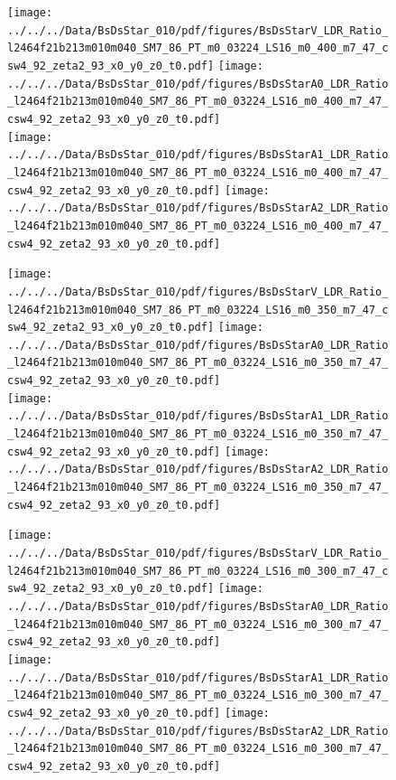 \documentclass[a4paper,10pt]{article}
\begin{document}
\begin{figure}[p]
 \texttt{[image: ../../../Data/BsDsStar\_010/pdf/figures/BsDsStarV\_LDR\_Ratio\_l2464f21b213m010m040\_SM7\_86\_PT\_m0\_03224\_LS16\_m0\_400\_m7\_47\_csw4\_92\_zeta2\_93\_x0\_y0\_z0\_t0.pdf]}  
\texttt{[image: ../../../Data/BsDsStar\_010/pdf/figures/BsDsStarA0\_LDR\_Ratio\_l2464f21b213m010m040\_SM7\_86\_PT\_m0\_03224\_LS16\_m0\_400\_m7\_47\_csw4\_92\_zeta2\_93\_x0\_y0\_z0\_t0.pdf]} \\ 
\texttt{[image: ../../../Data/BsDsStar\_010/pdf/figures/BsDsStarA1\_LDR\_Ratio\_l2464f21b213m010m040\_SM7\_86\_PT\_m0\_03224\_LS16\_m0\_400\_m7\_47\_csw4\_92\_zeta2\_93\_x0\_y0\_z0\_t0.pdf]}  
\texttt{[image: ../../../Data/BsDsStar\_010/pdf/figures/BsDsStarA2\_LDR\_Ratio\_l2464f21b213m010m040\_SM7\_86\_PT\_m0\_03224\_LS16\_m0\_400\_m7\_47\_csw4\_92\_zeta2\_93\_x0\_y0\_z0\_t0.pdf]} \\ 
\end{figure} 
\clearpage

\begin{figure}[p]
 \texttt{[image: ../../../Data/BsDsStar\_010/pdf/figures/BsDsStarV\_LDR\_Ratio\_l2464f21b213m010m040\_SM7\_86\_PT\_m0\_03224\_LS16\_m0\_350\_m7\_47\_csw4\_92\_zeta2\_93\_x0\_y0\_z0\_t0.pdf]}  
\texttt{[image: ../../../Data/BsDsStar\_010/pdf/figures/BsDsStarA0\_LDR\_Ratio\_l2464f21b213m010m040\_SM7\_86\_PT\_m0\_03224\_LS16\_m0\_350\_m7\_47\_csw4\_92\_zeta2\_93\_x0\_y0\_z0\_t0.pdf]} \\ 
\texttt{[image: ../../../Data/BsDsStar\_010/pdf/figures/BsDsStarA1\_LDR\_Ratio\_l2464f21b213m010m040\_SM7\_86\_PT\_m0\_03224\_LS16\_m0\_350\_m7\_47\_csw4\_92\_zeta2\_93\_x0\_y0\_z0\_t0.pdf]}  
\texttt{[image: ../../../Data/BsDsStar\_010/pdf/figures/BsDsStarA2\_LDR\_Ratio\_l2464f21b213m010m040\_SM7\_86\_PT\_m0\_03224\_LS16\_m0\_350\_m7\_47\_csw4\_92\_zeta2\_93\_x0\_y0\_z0\_t0.pdf]} \\ 
\end{figure} 
\clearpage

\begin{figure}[p]
 \texttt{[image: ../../../Data/BsDsStar\_010/pdf/figures/BsDsStarV\_LDR\_Ratio\_l2464f21b213m010m040\_SM7\_86\_PT\_m0\_03224\_LS16\_m0\_300\_m7\_47\_csw4\_92\_zeta2\_93\_x0\_y0\_z0\_t0.pdf]}  
\texttt{[image: ../../../Data/BsDsStar\_010/pdf/figures/BsDsStarA0\_LDR\_Ratio\_l2464f21b213m010m040\_SM7\_86\_PT\_m0\_03224\_LS16\_m0\_300\_m7\_47\_csw4\_92\_zeta2\_93\_x0\_y0\_z0\_t0.pdf]} \\ 
\texttt{[image: ../../../Data/BsDsStar\_010/pdf/figures/BsDsStarA1\_LDR\_Ratio\_l2464f21b213m010m040\_SM7\_86\_PT\_m0\_03224\_LS16\_m0\_300\_m7\_47\_csw4\_92\_zeta2\_93\_x0\_y0\_z0\_t0.pdf]}  
\texttt{[image: ../../../Data/BsDsStar\_010/pdf/figures/BsDsStarA2\_LDR\_Ratio\_l2464f21b213m010m040\_SM7\_86\_PT\_m0\_03224\_LS16\_m0\_300\_m7\_47\_csw4\_92\_zeta2\_93\_x0\_y0\_z0\_t0.pdf]} \\ 
\end{figure} 
\clearpage
\end{document}

